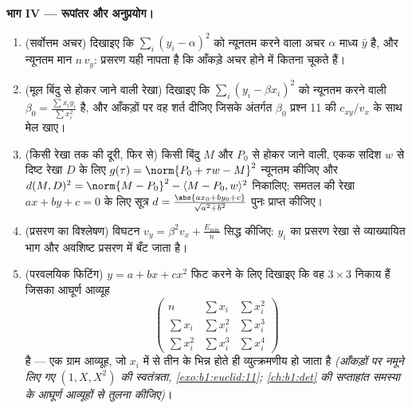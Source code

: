 \begin{problem}
\medskip
\noindent\textbf{भाग IV --- रूपांतर और अनुप्रयोग।}
\begin{enumerate}[resume]
  \item (सर्वोत्तम अचर) दिखाइए कि $\sum_i (y_i - \alpha)^2$ को न्यूनतम
        करने वाला अचर $\alpha$ माध्य $\bar y$ है, और न्यूनतम मान
        $n\,v_y$: प्रसरण यही नापता है कि आँकड़े अचर होने में कितना
        चूकते हैं।
  \item (मूल बिंदु से होकर जाने वाली रेखा) दिखाइए कि $\sum_i (y_i -
        \beta x_i)^2$ को न्यूनतम करने वाली  $\beta_0 =
        \frac{\sum x_iy_i}{\sum x_i^2}$ है, और आँकड़ों पर वह शर्त दीजिए
        जिसके अंतर्गत $\beta_0$ प्रश्न 11 की  $c_{xy}/v_x$ के
        साथ मेल खाए।
  \item (किसी रेखा तक की दूरी, फिर से) किसी बिंदु $M$ और $P_0$ से होकर
        जाने वाली, एकक सदिश $w$ से दिष्ट रेखा $D$ के लिए $g(\tau) =
        \norm{P_0 + \tau w - M}^2$ न्यूनतम कीजिए और $d(M, D)^2 =
        \norm{M - P_0}^2 - \langle M - P_0, w\rangle^2$ निकालिए; समतल
        की रेखा $ax + by + c = 0$ के लिए सूत्र $d = \frac{\abs{a x_0 +
        b y_0 + c}}{\sqrt{a^2 + b^2}}$ पुनः प्राप्त कीजिए।
  \item (प्रसरण का विश्लेषण) विघटन $v_y = \beta^2 v_x +
        \frac{E_{\min}}n$ सिद्ध कीजिए: $y_i$ का प्रसरण रेखा से
        व्याख्यायित भाग और अवशिष्ट प्रसरण में बँट जाता है।
  \item (परवलयिक फिटिंग) $y = a + bx + cx^2$ फिट करने के लिए दिखाइए कि
         वह $3 \times 3$ निकाय हैं जिसका आघूर्ण आव्यूह
        \[
        \begin{pmatrix}
        n & \sum x_i & \sum x_i^2\\
        \sum x_i & \sum x_i^2 & \sum x_i^3\\
        \sum x_i^2 & \sum x_i^3 & \sum x_i^4
        \end{pmatrix}
        \]
        है --- एक ग्राम आव्यूह, जो $x_i$ में से तीन के भिन्न होते ही
        व्युत्क्रमणीय हो जाता है \emph{(आँकड़ों पर नमूने लिए गए $(1, X,
        X^2)$ की स्वतंत्रता, \cref{exo:b1:euclid:11};
        \cref{ch:b1:det} की सप्ताहांत समस्या के आघूर्ण आव्यूहों से
        तुलना कीजिए)}।
\end{enumerate}


\end{problem}
